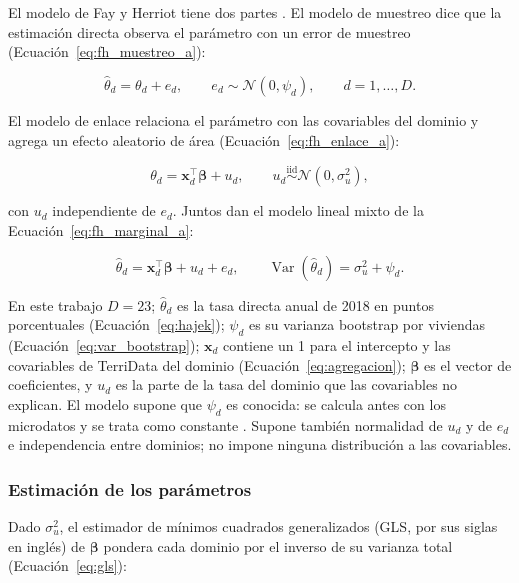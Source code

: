 El modelo de Fay y Herriot \cite{FayHerriot1979} tiene dos partes \cite[pp.~424--427, 490]{morales2021smallarea}. El modelo de muestreo dice que la estimación directa observa el parámetro con un error de muestreo (Ecuación~\ref{eq:fh_muestreo_a}):

\begin{equation}
    \hat{\theta}_d = \theta_d + e_d, \qquad e_d \sim \mathcal{N}(0, \psi_d), \qquad d = 1,\ldots,D .
    \label{eq:fh_muestreo_a}
\end{equation}

El modelo de enlace relaciona el parámetro con las covariables del dominio y agrega un efecto aleatorio de área (Ecuación~\ref{eq:fh_enlace_a}):

\begin{equation}
    \theta_d = \mathbf{x}_d^\top \boldsymbol{\beta} + u_d, \qquad u_d \stackrel{\text{iid}}{\sim} \mathcal{N}(0, \sigma_u^2),
    \label{eq:fh_enlace_a}
\end{equation}

con $u_d$ independiente de $e_d$. Juntos dan el modelo lineal mixto de la Ecuación~\ref{eq:fh_marginal_a}:

\begin{equation}
    \hat{\theta}_d = \mathbf{x}_d^\top \boldsymbol{\beta} + u_d + e_d, \qquad \operatorname{Var}(\hat{\theta}_d) = \sigma_u^2 + \psi_d .
    \label{eq:fh_marginal_a}
\end{equation}

En este trabajo $D = 23$; $\hat{\theta}_d$ es la tasa directa anual de 2018 en puntos porcentuales (Ecuación~\ref{eq:hajek}); $\psi_d$ es su varianza bootstrap por viviendas (Ecuación~\ref{eq:var_bootstrap}); $\mathbf{x}_d$ contiene un 1 para el intercepto y las covariables de TerriData del dominio (Ecuación~\ref{eq:agregacion}); $\boldsymbol{\beta}$ es el vector de coeficientes, y $u_d$ es la parte de la tasa del dominio que las covariables no explican. El modelo supone que $\psi_d$ es conocida: se calcula antes con los microdatos y se trata como constante \cite[p.~427]{morales2021smallarea}. Supone también normalidad de $u_d$ y de $e_d$ e independencia entre dominios; no impone ninguna distribución a las covariables.

\subsubsection{Estimación de los parámetros}

Dado $\sigma_u^2$, el estimador de mínimos cuadrados generalizados (GLS, por sus siglas en inglés) de $\boldsymbol{\beta}$ pondera cada dominio por el inverso de su varianza total (Ecuación~\ref{eq:gls}):

